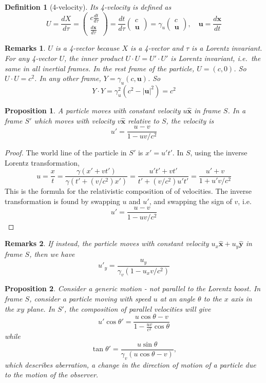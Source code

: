 \documentclass[a4paper]{article}
\newtheorem{defi}{Definition}[section]
\newtheorem{remarks}{Remarks}[section]
\newtheorem{prop}{Proposition}[section]
\theoremstyle{new}
\begin{document}
\begin{defi}[4-velocity]
Its 4-velocity is defined as
$$U = \frac{d X}{d \tau} =
    \begin{pmatrix}
      c\frac{d t}{d \tau}\\
      \frac{d \mathbf{x}}{d \tau}
    \end{pmatrix}
    = \frac{d t}{d \tau}
    \begin{pmatrix}
      c\\
      \mathbf{u}
    \end{pmatrix} = \gamma_u
    \begin{pmatrix}
      c\\
      \mathbf{u}
    \end{pmatrix},\quad\mathbf{u} = \frac{d \mathbf{x}}{d t}$$
\end{defi}
\begin{remarks}
$U$ is a 4-vector because $X$ is a 4-vector and $\tau$ is a Lorentz invariant. For any 4-vector $U$, the inner product $U\cdot U = U' \cdot U'$ is Lorentz invariant, i.e.\ the same in all inertial frames. In the rest frame of the particle, $U = (c, 0)$. So $U\cdot U = c^2$. In any other frame, $Y = \gamma_u(c, \mathbf{u})$. So
$$ Y\cdot Y = \gamma_u^2 (c^2 - |\mathbf{u}|^2) = c^2$$
\end{remarks}
\begin{prop}
A particle moves with constant velocity $u\mathbf{\hat{x}}$ in frame $S$. In a frame $S'$ which moves with velocity $v\mathbf{\hat{x}}$ relative to $S$, the velocity is
$$u'=\frac{u-v}{1-uv/c^2}$$
\end{prop}
\begin{proof}
The world line of the particle in $S'$ is $x'=u't'$. In $S$, using the inverse Lorentz transformation,
$$u = \frac{x}{t} = \frac{\gamma(x' + vt')}{\gamma(t' + (v/c^2) x')} = \frac{u't' + vt'}{t' + (v/c^2)u't'} = \frac{u' + v}{1 + u'v/c^2}$$
This is the formula for the relativistic composition of of velocities. The inverse transformation is found by swapping $u$ and $u'$, and swapping the sign of $v$, i.e.
$$ u' = \frac{u - v}{1 - uv/c^2}$$
\end{proof}
\begin{remarks}
If instead, the particle moves with constant velocity $u_x\mathbf{\hat{x}}+u_y\mathbf{\hat{y}}$ in frame $S$, then we have
$$u'_y=\frac{u_y}{\gamma_v(1-u_xv/c^2)}$$
\end{remarks}
\begin{prop}
Consider a generic motion - not parallel to the Lorentz boost. In frame $S$, consider a particle moving with speed $u$ at an angle $\theta$ to the $x$ axis in the $xy$ plane. In $S'$, the composition of parallel velocities will give
$$u'\cos \theta' = \frac{u\cos \theta - v}{1 - \frac{uv}{c^2}\cos \theta}$$
while
\[
  \tan \theta' = \frac{u\sin \theta}{\gamma_v(u\cos \theta - v)},
\]
which describes aberration, a change in the direction of motion of a particle due to the motion of the observer. 
\end{prop}
\end{document}
